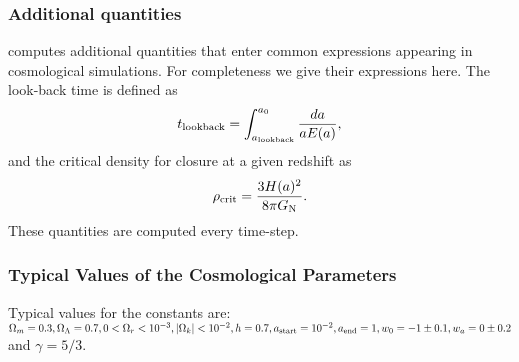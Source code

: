 \subsubsection{Additional quantities}

\swift computes additional quantities that enter common expressions appearing in
cosmological simulations. For completeness we give their expressions here. The
look-back time is defined as
\begin{equation}
  t_{\rm lookback} = \int_{a_{\rm lookback}}^{a_0} \frac{da}{a E(a)},
\end{equation}
and the critical density for closure at a given redshift as
\begin{equation}
  \rho_{\rm crit} = \frac{3H(a)^2}{8\pi G_{\rm{N}}}.
\end{equation}
These quantities are computed every time-step.

\subsubsection{Typical Values of the Cosmological Parameters}

Typical values for the constants are: $\Omega_m = 0.3, \Omega_\Lambda=0.7, 0 <
\Omega_r<10^{-3}, |\Omega_k | < 10^{-2}, h=0.7, a_{\rm start} = 10^{-2}, a_{\rm
end} = 1, w_0 = -1\pm 0.1, w_a=0\pm0.2$ and $\gamma = 5/3$.
